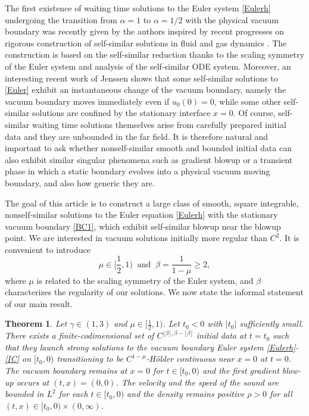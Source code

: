 \documentclass{article}
\newcommand{\ga}{\gamma}
\def\be{\begin{equation}}
\def\ee{\end{equation}}
\numberwithin{equation}{section}
\newtheorem{theorem}{Theorem}[section]
\begin{document}
The first existence of
waiting time solutions to the Euler system \eqref{Eulerh} undergoing the transition from  $\alpha=1$ to $\alpha=1/2$ with the physical vacuum boundary was recently given  by the authors \cite{JLN2025} inspired by recent progresses on rigorous construction of self-similar solutions in fluid and gas dynamics \cite{GHJ21,GHJ23,GHJS22,JLS23,JLS24,Jenssen18,Jenssen23,Merle22a}. The construction is based on the self-similar reduction thanks to the scaling symmetry of the Euler system and analysis of the self-similar ODE system. Moreover, an interesting recent  work  \cite{Jenssen} of Jenssen shows that some self-similar solutions to  \eqref{Euler} exhibit an instantaneous change of the vacuum boundary, namely the vacuum boundary moves immediately even if $u_0(0)=0$, while some other self-similar solutions are confined by the stationary interface $x=0$. Of course,  self-similar waiting time solutions themselves arise from carefully prepared initial data and they are unbounded in the far field. It is therefore natural and important to ask whether nonself-similar smooth and bounded initial data can also exhibit similar singular phenomena such as gradient blowup or a transient phase in which a static boundary evolves into a physical vacuum moving boundary, and also how generic they are. 









The goal of this article is to construct a large class of smooth, square integrable, nonself-similar solutions to the Euler equation \eqref{Eulerh} with the stationary vacuum boundary \eqref{BC1}, which exhibit self-similar blowup \cite{JLN2025} near the blowup point. 
We are interested in vacuum solutions initially more regular than $C^2$. 
It is convenient to 
introduce 
\be\label{beta}
 \mu \in [\frac12,1) %
\ \text{ and } \  \beta= \frac{1}{1-\mu} \ge 2,  
\ee 
where $\mu$ is related to the scaling symmetry of the Euler system, and $\beta$ 
characterizes the regularity of our solutions. 
 We now state the informal statement of our main result. 

\begin{theorem}\label{thm 1.1}
    Let $\ga\in(1,3)$ and $\mu\in[\frac12,1)$.  Let $t_0<0$ with $|t_0|$ sufficiently small. There exists a finite-codimensional set of $C^{\lfloor\beta \rfloor, \beta- \lfloor\beta \rfloor }$ initial data at $t=t_0$ such that they launch strong  solutions to the vacuum boundary Euler system \eqref{Eulerh}-\eqref{IC} on $[t_0,0)$ transitioning to be $C^{1-\mu}$-H\"{o}lder continuous near $x=0$ at $t=0$. 
    The vacuum boundary remains at $x=0$ for $t\in [t_0,0)$ and the first gradient blow-up occurs at $(t,x)=(0,0)$.  The velocity and the speed of the sound are bounded in $L^2$ for each   $t\in [t_0,0)$  and the density remains positive $\rho>0$ for all $(t,x)\in[t_0,0)\times(0,\infty)$.   
\end{theorem}
\end{document}
